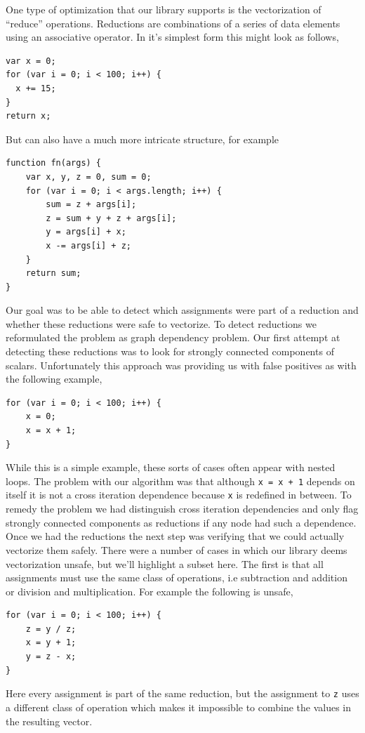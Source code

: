 \documentclass[conference]{IEEEtran}
\begin{document}
One type of optimization that our library supports is the vectorization of
``reduce'' operations. Reductions are combinations of a series of data elements
using an associative operator. In it's simplest form this might look as
follows,
\begin{verbatim}
var x = 0;
for (var i = 0; i < 100; i++) {
  x += 15;
}
return x;
\end{verbatim}
  But can also have a much more intricate structure, for example
\begin{verbatim}
function fn(args) {
    var x, y, z = 0, sum = 0;
    for (var i = 0; i < args.length; i++) {
        sum = z + args[i];
        z = sum + y + z + args[i];
        y = args[i] + x;
        x -= args[i] + z;
    }
    return sum;
}

\end{verbatim}
Our goal was to be able to detect which assignments were part of a reduction and
whether these reductions were safe to vectorize.
To detect reductions we reformulated the problem as graph dependency
problem. Our first attempt at detecting these reductions was to look for
strongly connected components of scalars. Unfortunately this approach was providing
us with false positives as with the following example,
\begin{verbatim}
for (var i = 0; i < 100; i++) {
    x = 0;
    x = x + 1;
}
\end{verbatim}
While this is a simple example, these sorts of cases often appear with nested
loops. The problem with our algorithm was that although \texttt{x = x + 1}
depends on itself it is not a cross iteration dependence because \texttt{x} is
redefined in between. To remedy the problem we had distinguish cross iteration
dependencies and only flag strongly connected components as reductions if any
node had such a dependence.
Once we had the reductions the next step was verifying that we could actually
vectorize them safely. There were a number of cases in which our library deems
vectorization unsafe, but we'll highlight a subset here. The first is that all
assignments must use the same class of operations, i.e subtraction and addition
or division and multiplication. For example the following is unsafe,
\begin{verbatim}
for (var i = 0; i < 100; i++) {
    z = y / z;
    x = y + 1;
    y = z - x;
}
\end{verbatim}
Here every assignment is part of the same reduction, but the assignment to
\texttt{z} uses a different class of operation which makes it impossible to
combine the values in the resulting vector.
\end{document}
